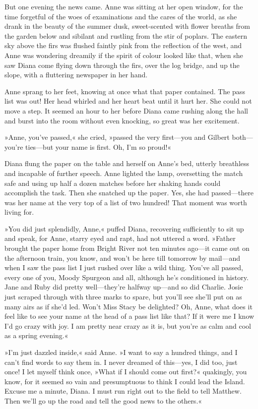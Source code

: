 But one evening the news came. Anne was sitting at her open window, for the time forgetful of the woes of examinations and the cares of the world, as she drank in the beauty of the summer dusk, sweet-scented with flower breaths from the garden below and sibilant and rustling from the stir of poplars. The eastern sky above the firs was flushed faintly pink from the reflection of the west, and Anne was wondering dreamily if the spirit of colour looked like that, when she saw Diana come flying down through the firs, over the log bridge, and up the slope, with a fluttering newspaper in her hand.

Anne sprang to her feet, knowing at once what that paper contained. The pass list was out! Her head whirled and her heart beat until it hurt her. She could not move a step. It seemed an hour to her before Diana came rushing along the hall and burst into the room without even knocking, so great was her excitement.

»Anne, you’ve passed,« she cried, »passed the very first—you and Gilbert both—you’re ties—but your name is first. Oh, I’m so proud!«

Diana flung the paper on the table and herself on Anne’s bed, utterly breathless and incapable of further speech. Anne lighted the lamp, oversetting the match safe and using up half a dozen matches before her shaking hands could accomplish the task. Then she snatched up the paper. Yes, she had passed—there was her name at the very top of a list of two hundred! That moment was worth living for.

»You did just splendidly, Anne,« puffed Diana, recovering sufficiently to sit up and speak, for Anne, starry eyed and rapt, had not uttered a word. »Father brought the paper home from Bright River not ten minutes ago—it came out on the afternoon train, you know, and won’t be here till tomorrow by mail—and when I saw the pass list I just rushed over like a wild thing. You’ve all passed, every one of you, Moody Spurgeon and all, although he’s conditioned in history. Jane and Ruby did pretty well—they’re halfway up—and so did Charlie. Josie just scraped through with three marks to spare, but you’ll see she’ll put on as many airs as if she’d led. Won’t Miss Stacy be delighted? Oh, Anne, what does it feel like to see your name at the head of a pass list like that? If it were me I know I’d go crazy with joy. I am pretty near crazy as it is, but you’re as calm and cool as a spring evening.«

»I’m just dazzled inside,« said Anne. »I want to say a hundred things, and I can’t find words to say them in. I never dreamed of this—yes, I did too, just once! I let myself think once, »What if I should come out first?« quakingly, you know, for it seemed so vain and presumptuous to think I could lead the Island. Excuse me a minute, Diana. I must run right out to the field to tell Matthew. Then we’ll go up the road and tell the good news to the others.«

